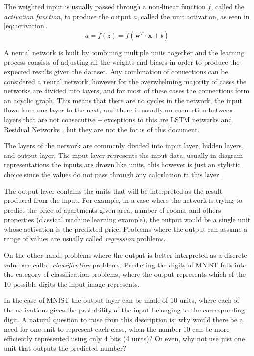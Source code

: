 The weighted input is usually passed through a non-linear function $f$, called the \textit{activation function}, to produce the output $a$, called the unit activation, as seen in \autoref{eq:activation}.
\begin{equation} \label{eq:activation}
    a = f\left(z\right) = f\left(\bm{w}^T \cdot \bm{x} + b\right)
\end{equation}

A neural network is built by combining multiple units together and the learning process consists of adjusting all the weights and biases in order to produce the expected results given the dataset. Any combination of connections can be considered a neural network, however for the overwhelming majority of cases the networks are divided into layers, and for most of these cases the connections form an acyclic graph. This means that there are no cycles in the network, the input flows from one layer to the next, and there is usually no connection between layers that are not consecutive \textbf{--} exceptions to this are \gls{LSTM} networks \cite{lstm1997} and Residual Networks \cite{resnet2015}, but they are not the focus of this document.

The layers of the network are commonly divided into input layer, hidden layers, and output layer. The input layer represents the input data, usually in diagram representations the inputs are drawn like units, this however is just an stylistic choice since the values do not pass through any calculation in this layer.

The output layer contains the units that will be interpreted as the result produced from the input. For example, in a case where the network is trying to predict the price of apartments given area, number of rooms, and others properties (classical machine learning example), the output would be a single unit whose activation is the predicted price. Problems where the output can assume a range of values are usually called \textit{regression} problems.

On the other hand, problems where the output is better interpreted as a discrete value are called \textit{classification} problems. Predicting the digits of \gls{MNIST} falls into the category of classification problems, where the output represents which of the 10 possible digits the input image represents.

In the case of \gls{MNIST} the output layer can be made of 10 units, where each of the activations gives the probability of the input belonging to the corresponding digit. A natural question to raise from this description is: why would there be a need for one unit to represent each class, when the number 10 can be more efficiently represented using only 4 bits (4 units)? Or even, why not use just one unit that outputs the predicted number?

